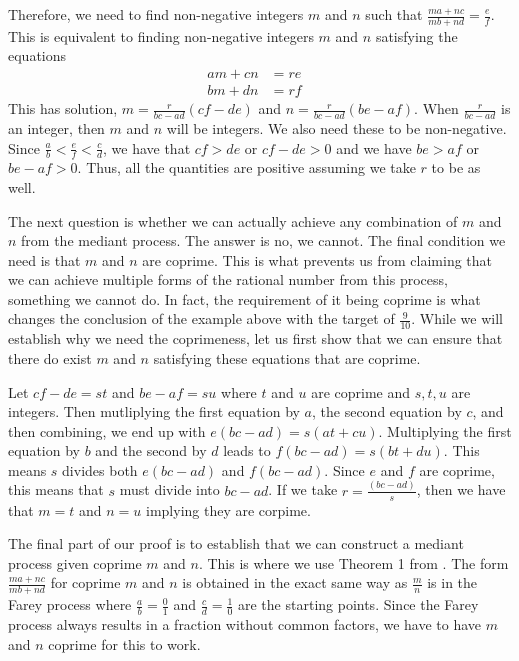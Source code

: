 \documentclass[12pt]{article}
\begin{document}
Therefore, we need to find non-negative integers $m$ and $n$ such that $\frac{ma+nc}{mb+nd} = \frac{e}{f}$. This is equivalent to finding non-negative integers $m$ and $n$
satisfying the equations
\begin{align*}
    am + cn &= re & \\
    bm + dn &= rf & 
\end{align*}
This has solution, $m = \frac{r}{bc-ad} (cf-de)$ and $n= \frac{r}{bc-ad} (be-af)$. When $\frac{r}{bc-ad}$ is an integer, then $m$ and $n$ will be integers. We also need these to be non-negative. Since $\frac{a}{b} < \frac{e}{f} < \frac{c}{d}$, we have that $cf>de$ or $cf - de > 0$ and we have $be>af$ or $be - af > 0$. Thus, all the quantities are positive assuming we take $r$ to be as well. 

The next question is whether we can actually achieve any combination of $m$ and $n$ from the mediant process. The answer is no, we cannot. The final condition we need is that $m$ and $n$ are coprime. This is what prevents us from claiming that we can achieve multiple forms of the rational number from this process, something we cannot do. In fact, the requirement of it being coprime is what changes the conclusion of the example above with the target of $\frac{9}{10}$. While we will establish why we need the coprimeness, let us first show that we can ensure that there do exist $m$ and $n$ satisfying these equations that are coprime. 

Let $cf-de = st$ and $be-af = su$ where $t$ and $u$ are coprime and $s, t, u$ are integers.  Then mutliplying the first equation by $a$, the second equation by $c$, and then combining, we end up with $e (bc -ad) = s (at  + cu)$. Multiplying the first equation by $b$ and the second by $d$ leads to $f (bc - ad) = s(bt + du)$. This means $s$ divides both $e(bc-ad)$ and $f(bc-ad)$. Since $e$ and $f$ are coprime, this means that $s$ must divide into $bc-ad$. If we take $r = \frac{(bc-ad)}{s}$, then we have that $m=t$ and $n=u$ implying they are corpime. 

The final part of our proof is to establish that we can construct a mediant process given coprime $m$ and $n$. This is where we use Theorem 1 from \cite{richards}. The form $\frac{ma + nc}{mb+nd}$ for coprime $m$ and $n$ is obtained in the exact same way as $\frac{m}{n}$ is in the Farey process where $\frac{a}{b}= \frac{0}{1}$ and $\frac{c}{d}=\frac{1}{0}$ are the starting points. Since the Farey process always results in a fraction without common factors, we have to have $m$ and $n$ coprime for this to work.  
\end{document}
